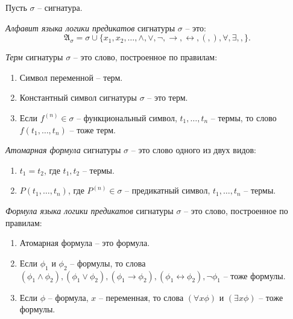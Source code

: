 \begin{note}
    Пусть $ \sigma $ -- сигнатура.

    \emph{Алфавит языка логики предикатов} сигнатуры $ \sigma $ -- это:
    \[
        \mathfrak{A}_\sigma = \sigma \cup \{x_1,x_2,\ldots,\land,\lor,\lnot,\rightarrow,\leftrightarrow, (,),\forall,\exists, ,\}.
    \]
\end{note}

\begin{definition}[Терм]
    \emph{Терм} сигнатуры $ \sigma $ -- это слово, построенное по правилам:
    \begin{enumerate}
        \item Символ переменной -- терм.
        \item Константный символ сигнатуры $ \sigma $ -- это терм.
        \item Если $ f^{(n)} \in \sigma $ -- функциональный символ, $ t_1,\ldots,t_n $ -- термы, то слово $ f(t_1,\ldots,t_n) $ -- тоже терм.
    \end{enumerate}
\end{definition}

\begin{definition}
    \emph{Атомарная формула} сигнатуры $ \sigma $ -- это слово одного из двух видов:
    \begin{enumerate}
        \item $ t_1 = t_2 $, где $ t_1,t_2 $ -- термы.
        \item $ P(t_1,\ldots,t_n) $, где $ P^{(n)} \in \sigma $ -- предикатный символ, $ t_1,\ldots,t_n $ -- термы.
    \end{enumerate}
\end{definition}

\begin{definition}
    \emph{Формула языка логики предикатов} сигнатуры $ \sigma $ -- это слово, построенное по правилам:
    \begin{enumerate}
        \item Атомарная формула -- это формула.
        \item Если $ \phi_1 $ и $ \phi_2 $ -- формулы, то слова $ (\phi_1 \land \phi_2),(\phi_1 \lor \phi_2), (\phi_1 \rightarrow \phi_2),(\phi_1 \leftrightarrow \phi_2), \lnot\phi_1 $ -- тоже формулы.
        \item Если $ \phi $ -- формула, $ x $ -- переменная, то слова $ (\forall x \phi) $ и $ (\exists x \phi) $ -- тоже формулы.
    \end{enumerate}
\end{definition}

